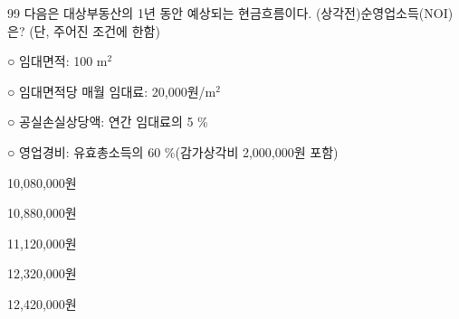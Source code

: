 \begin{question}{99}
다음은 대상부동산의 1년 동안 예상되는 현금흐름이다. (상각전)순영업소득(NOI)은? (단, 주어진 조건에 한함)
\begin{framedtext}
○ 임대면적: 100 m$^2$ \par
○ 임대면적당 매월 임대료: 20,000원/m$^2$ \par
○ 공실손실상당액: 연간 임대료의 5 \% \par
○ 영업경비: 유효총소득의 60 \%(감가상각비 2,000,000원 포함) \par
\end{framedtext}
\begin{choices}
  \item 10,080,000원
  \item 10,880,000원
  \item 11,120,000원
  \item 12,320,000원
  \item 12,420,000원
\end{choices}
\end{question}
